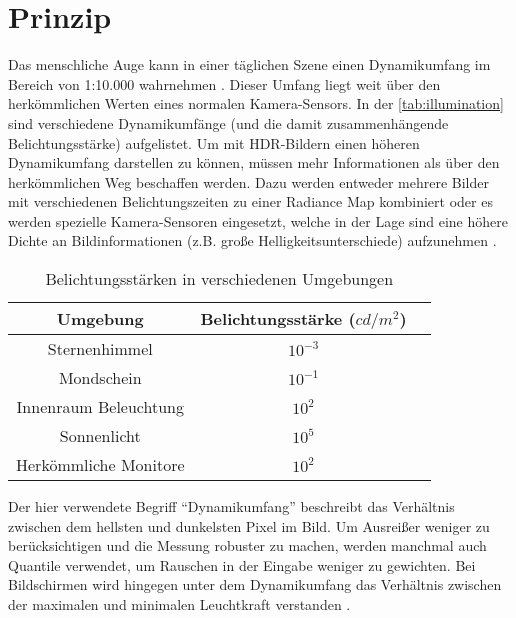 \section{Prinzip}

Das menschliche Auge kann in einer täglichen Szene einen \gls{Dynamikumfang} im Bereich von 1:10.000 wahrnehmen \cite{Fairchild04theicam}. Dieser Umfang liegt weit über den herkömmlichen Werten eines normalen Kamera-Sensors. In der \autoref{tab:illumination} sind verschiedene Dynamikumfänge (und die damit zusammenhängende Belichtungsstärke) aufgelistet. 
Um mit \gls{HDR}-Bildern einen höheren \gls{Dynamikumfang} darstellen zu können, müssen mehr Informationen als über den herkömmlichen Weg beschaffen werden. Dazu werden entweder mehrere Bilder mit verschiedenen Belichtungszeiten zu einer \gls{Radiance Map} kombiniert oder es werden spezielle Kamera-Sensoren eingesetzt, welche in der Lage sind eine höhere Dichte an Bildinformationen (z.B. große Helligkeitsunterschiede) aufzunehmen \cite{Yang99a640}. 


\begin{table}
  \begin{center}
    \begin{tabular}{ccc}
	\toprule
	Umgebung & Belichtungsstärke ($cd/m^2$)\\ \midrule
	Sternenhimmel & $10^{-3} $\\	
	Mondschein & $10^{-1} $\\	
	Innenraum Beleuchtung & $10^{2} $\\	
	Sonnenlicht & $10^{5} $\\	
	\midrule
	Herkömmliche Monitore & $10^{2} $\\	
	\bottomrule
    \end{tabular}
    \caption{Belichtungsstärken in verschiedenen Umgebungen \cite[S.~6]{Reinhard}}
    \label{tab:illumination}
  \end{center}
\end{table}



Der hier verwendete Begriff \enquote{\gls{Dynamikumfang}} beschreibt das Verhältnis zwischen dem hellsten und dunkelsten Pixel im Bild. Um Ausreißer weniger zu berücksichtigen und die Messung robuster zu machen, werden manchmal auch Quantile verwendet, um Rauschen in der Eingabe weniger zu gewichten. Bei Bildschirmen wird hingegen unter dem \gls{Dynamikumfang} das Verhältnis zwischen der maximalen und minimalen Leuchtkraft verstanden \cite[S.~4]{Reinhard}.

